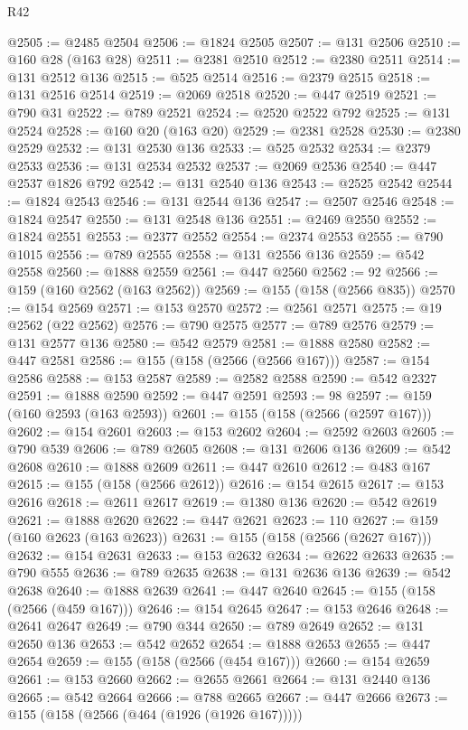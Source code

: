 \begin{lexlean}{R42}
\begin{coremodule}
@2505 := @2485 @2504
@2506 := @1824 @2505
@2507 := @131 @2506
@2510 := @160 @28 (@163 @28)
@2511 := @2381 @2510
@2512 := @2380 @2511
@2514 := @131 @2512 @136
@2515 := @525 @2514
@2516 := @2379 @2515
@2518 := @131 @2516 @2514
@2519 := @2069 @2518
@2520 := @447 @2519
@2521 := @790 @31
@2522 := @789 @2521
@2524 := @2520 @2522 @792
@2525 := @131 @2524
@2528 := @160 @20 (@163 @20)
@2529 := @2381 @2528
@2530 := @2380 @2529
@2532 := @131 @2530 @136
@2533 := @525 @2532
@2534 := @2379 @2533
@2536 := @131 @2534 @2532
@2537 := @2069 @2536
@2540 := @447 @2537 @1826 @792
@2542 := @131 @2540 @136
@2543 := @2525 @2542
@2544 := @1824 @2543
@2546 := @131 @2544 @136
@2547 := @2507 @2546
@2548 := @1824 @2547
@2550 := @131 @2548 @136
@2551 := @2469 @2550
@2552 := @1824 @2551
@2553 := @2377 @2552
@2554 := @2374 @2553
@2555 := @790 @1015
@2556 := @789 @2555
@2558 := @131 @2556 @136
@2559 := @542 @2558
@2560 := @1888 @2559
@2561 := @447 @2560
@2562 := 92
@2566 := @159 (@160 @2562 (@163 @2562))
@2569 := @155 (@158 (@2566 @835))
@2570 := @154 @2569
@2571 := @153 @2570
@2572 := @2561 @2571
@2575 := @19 @2562 (@22 @2562)
@2576 := @790 @2575
@2577 := @789 @2576
@2579 := @131 @2577 @136
@2580 := @542 @2579
@2581 := @1888 @2580
@2582 := @447 @2581
@2586 := @155 (@158 (@2566 (@2566 @167)))
@2587 := @154 @2586
@2588 := @153 @2587
@2589 := @2582 @2588
@2590 := @542 @2327
@2591 := @1888 @2590
@2592 := @447 @2591
@2593 := 98
@2597 := @159 (@160 @2593 (@163 @2593))
@2601 := @155 (@158 (@2566 (@2597 @167)))
@2602 := @154 @2601
@2603 := @153 @2602
@2604 := @2592 @2603
@2605 := @790 @539
@2606 := @789 @2605
@2608 := @131 @2606 @136
@2609 := @542 @2608
@2610 := @1888 @2609
@2611 := @447 @2610
@2612 := @483 @167
@2615 := @155 (@158 (@2566 @2612))
@2616 := @154 @2615
@2617 := @153 @2616
@2618 := @2611 @2617
@2619 := @1380 @136
@2620 := @542 @2619
@2621 := @1888 @2620
@2622 := @447 @2621
@2623 := 110
@2627 := @159 (@160 @2623 (@163 @2623))
@2631 := @155 (@158 (@2566 (@2627 @167)))
@2632 := @154 @2631
@2633 := @153 @2632
@2634 := @2622 @2633
@2635 := @790 @555
@2636 := @789 @2635
@2638 := @131 @2636 @136
@2639 := @542 @2638
@2640 := @1888 @2639
@2641 := @447 @2640
@2645 := @155 (@158 (@2566 (@459 @167)))
@2646 := @154 @2645
@2647 := @153 @2646
@2648 := @2641 @2647
@2649 := @790 @344
@2650 := @789 @2649
@2652 := @131 @2650 @136
@2653 := @542 @2652
@2654 := @1888 @2653
@2655 := @447 @2654
@2659 := @155 (@158 (@2566 (@454 @167)))
@2660 := @154 @2659
@2661 := @153 @2660
@2662 := @2655 @2661
@2664 := @131 @2440 @136
@2665 := @542 @2664
@2666 := @788 @2665
@2667 := @447 @2666
@2673 := @155 (@158 (@2566 (@464 (@1926 (@1926 @167)))))

\end{coremodule}
\end{lexlean}
